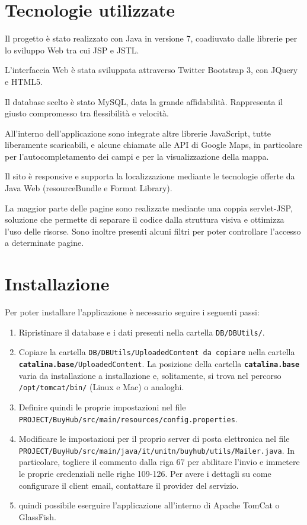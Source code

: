 
\chapter{Tecnologie utilizzate}

Il progetto è stato realizzato con Java in versione 7, coadiuvato dalle librerie per lo sviluppo Web tra cui JSP e JSTL.

L'interfaccia Web è stata sviluppata attraverso Twitter Bootstrap 3, con JQuery e HTML5.

Il database scelto è stato MySQL, data la grande affidabilità. Rappresenta il giusto compromesso tra flessibilità e velocità.

All'interno dell'applicazione sono integrate altre librerie JavaScript, tutte liberamente scaricabili, e alcune chiamate alle API di Google Maps, in particolare per l'autocompletamento dei campi e per la visualizzazione della mappa.

Il sito è responsive e supporta la localizzazione mediante le tecnologie offerte da Java Web (resourceBundle e Format Library).

La maggior parte delle pagine sono realizzate mediante una coppia servlet-JSP, soluzione che permette di separare il codice dalla struttura visiva e ottimizza l'uso delle risorse. Sono inoltre presenti alcuni filtri per poter controllare l'accesso a determinate pagine.




\chapter{Installazione}
Per poter installare l'applicazione è necessario seguire i seguenti passi:
\begin{enumerate}

\item Ripristinare il database e i dati presenti nella cartella \texttt{DB/DBUtils/}.
\item Copiare la cartella \texttt{DB/DBUtils/UploadedContent da copiare} nella cartella \\\texttt{\textbf{catalina.base}/UploadedContent}.
La posizione della cartella \texttt{\textbf{catalina.base}} varia da installazione a installazione e, solitamente, si trova nel percorso \texttt{/opt/tomcat/bin/} (Linux e Mac) o analoghi.
\item Definire quindi le proprie impostazioni nel file \\\texttt{PROJECT/BuyHub/src/main/resources/config.properties}.
\item Modificare le impostazioni per il proprio server di posta elettronica nel file\\ \texttt{PROJECT/BuyHub/src/main/java/it/unitn/buyhub/utils/Mailer.java}. In particolare, togliere il commento dalla riga 67 per abilitare l'invio e immetere le proprie credenziali nelle righe 109-126. Per avere i dettagli su come configurare il client email, contattare il provider del servizio.
\item \E quindi possibile eserguire l'applicazione all'interno di Apache TomCat o GlassFish.
\end{enumerate}

